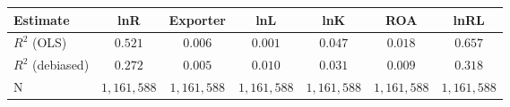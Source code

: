 \begin{tabular}{l*{6}{c}}
\hline\hline
 Estimate & lnR & Exporter & lnL & lnK & ROA & lnRL \\
\hline
\addlinespace $ R^2$ (OLS) & $0.521$ & $0.006$ & $0.001$ & $0.047$ & $0.018$ & $0.657$ \\
$ R^2$ (debiased) & $0.272$ & $0.005$ & $0.010$ & $0.031$ & $0.009$ & $0.318$ \\
N & $1,161,588$ & $1,161,588$ & $1,161,588$ & $1,161,588$ & $1,161,588$ & $1,161,588$ \\
\hline\hline
\end{tabular}
